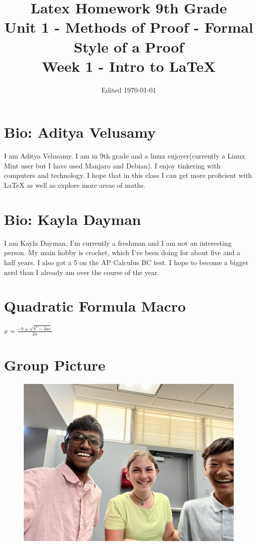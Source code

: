 \documentclass{article}
\title{Latex Homework 9th Grade\\ Unit 1 - Methods of Proof - Formal Style of a Proof\\ Week 1 - Intro to LaTeX}
\author{}
\date{Edited \today}
\newcommand{\quadform}{$x=\frac{-b\pm\sqrt{b^2-4ac}}{2a}$}
\begin{document}
\maketitle

\section{Bio: Aditya Velusamy}
I am Aditya Velusamy. I am in 9th grade and a linux enjoyer(currently a Linux Mint user but I have used Manjaro and Debian). I enjoy tinkering with computers and technology. I hope that in this class I can get more proficient with LaTeX as well as explore more areas of maths.
\section{Bio: Kayla Dayman}
I am Kayla Dayman, I'm currently a freshman and I am not an interesting person. My main hobby is crochet, which I've been doing for about five and a half years. I also got a 5 on the AP Calculus BC test. I hope to become a bigger nerd than I already am over the course of the year.
\section{Quadratic Formula Macro}
\quadform
\section{Group Picture}
\begin{figure}
\centering
\includegraphics[scale=0.2]{./IMG_1617.jpg}
\end{figure}
\end{document}
